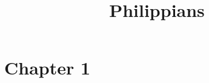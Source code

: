 \documentclass{article}
\newcounter{versecounter}
\newcommand{\newverse}{%
  \stepcounter{versecounter}%
  \setcounter{footnote}{0}%
}
\renewcommand{\thefootnote}{\textsuperscript{\arabic{footnote}}}
\begin{document}

\newcommand{\versenum}[1]{%
  \newverse%
  \textcolor{verseblue}{#1}%
}

\renewcommand{\thefootnote}{\textcolor{footnotered}{\arabic{footnote}}}

\title{Philippians}
\date{}
\maketitle
\section*{Chapter 1}
\end{document}

